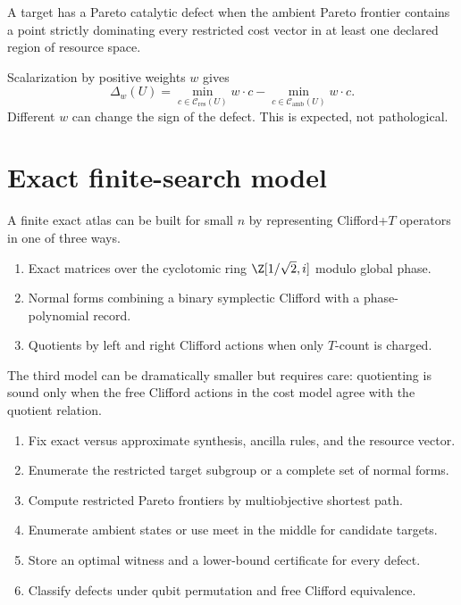 \begin{definition}
A target has a Pareto catalytic defect when the ambient Pareto frontier contains a point strictly dominating every restricted cost vector in at least one declared region of resource space.
\end{definition}

Scalarization by positive weights $w$ gives
\[
\Delta_w(U)=
\min_{c\in\mathcal C_{\mathrm{res}}(U)}w\cdot c
-
\min_{c\in\mathcal C_{\mathrm{amb}}(U)}w\cdot c.
\]
Different $w$ can change the sign of the defect.  This is expected, not pathological.

\section{Exact finite-search model}
A finite exact atlas can be built \cite{KliuchnikovEtAl2013,AmyEtAl2013} for small $n$ by representing Clifford+$T$ operators in one of three ways.
\begin{enumerate}
\item Exact matrices over the cyclotomic ring $\Z[1/\sqrt2,i]$ modulo global phase.
\item Normal forms combining a binary symplectic Clifford with a phase-polynomial record.
\item Quotients by left and right Clifford actions when only $T$-count is charged.
\end{enumerate}
The third model can be dramatically smaller but requires care: quotienting is sound only when the free Clifford actions in the cost model agree with the quotient relation.

\begin{protocol}
\begin{enumerate}
\item Fix exact versus approximate synthesis, ancilla rules, and the resource vector.
\item Enumerate the restricted target subgroup or a complete set of normal forms.
\item Compute restricted Pareto frontiers by multiobjective shortest path.
\item Enumerate ambient states or use meet in the middle for candidate targets.
\item Store an optimal witness and a lower-bound certificate for every defect.
\item Classify defects under qubit permutation and free Clifford equivalence.
\end{enumerate}
\end{protocol}

